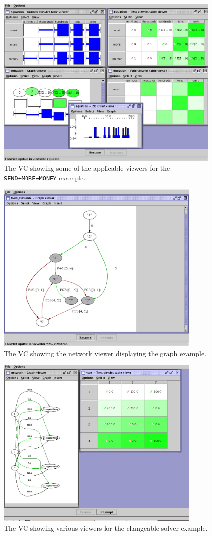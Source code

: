 \begin{figure}[htsp]
\centering
\includegraphics[width=11cm]{vcallviewers}
\caption{The VC showing some of the applicable viewers for the \texttt{SEND+MORE=MONEY} example.}
\label{fig:allviewers}
\end{figure}

\begin{figure}[htsp]
\centering
\includegraphics[width=10cm]{vcnetworkviewer}
\caption{The VC showing the network viewer displaying the graph example.}
\label{fig:networkviewer}
\end{figure}

\begin{figure}[htsp]
\centering
\includegraphics[width=10cm]{vcchangeableexample}
\caption{The VC showing various viewers for the changeable solver example.}
\label{fig:changeableexample}
\end{figure}

